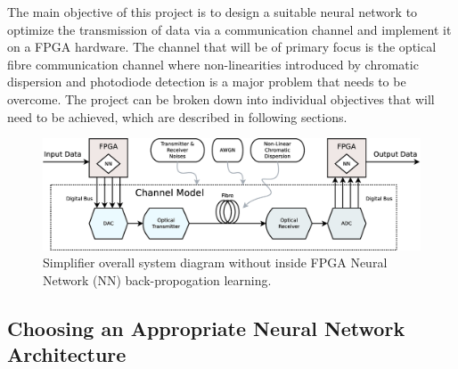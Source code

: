 \fi

The main objective of this project is to design a suitable neural network to optimize the transmission of data via a communication channel and implement it on a FPGA hardware. The channel that will be of primary focus is the optical fibre communication channel where non-linearities introduced by chromatic dispersion and photodiode detection is a major problem that needs to be overcome. The project can be broken down into individual objectives that will need to be achieved, which are described in following sections.

\begin{figure}[h!]
	\centering
	\includegraphics[width=\linewidth]{graphics/overall_diagram2.eps}
	\caption{Simplifier overall system diagram without inside FPGA Neural Network (NN) back-propogation learning.}
	\label{fig:overall}	
\end{figure}

\subsection{Choosing an Appropriate Neural Network Architecture}

